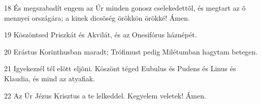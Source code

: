 \par 18 És megszabadít engem az Úr minden gonosz cselekedettõl, és megtart az õ mennyei országára; a kinek dicsõség örökkön örökké! Ámen.
\par 19 Köszöntsed Priszkát és Akvilát, és az Onesifórus háznépét.
\par 20 Erástus Korinthusban maradt; Trófimust pedig Milétumban hagytam betegen.
\par 21 Igyekezzél tél elõtt eljõni. Köszönt téged Eubulus és Pudens és Linus és Klaudia, és mind az atyafiak.
\par 22 Az Úr Jézus Krisztus a te lelkeddel. Kegyelem veletek! Ámen.


